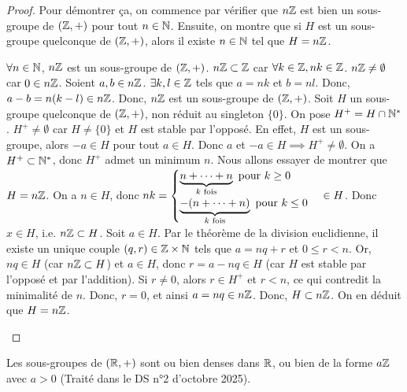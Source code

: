 \documentclass[12pt, a4paper]{report}
\begin{document}
\begin{proof}
    Pour démontrer ça, on commence par vérifier que $n\mathbb{Z}$ est bien un sous-groupe de $(\mathbb{Z},+)$ pour tout $n\in\mathbb{N}$. Ensuite, on montre que si $H$ est un sous-groupe quelconque de $(\mathbb{Z},+)$, alors il existe $n\in\mathbb{N}$ tel que $H=n\mathbb{Z}$.

    \begin{outline}
        \1 $\forall n \in \mathbb{N}$, $n\mathbb{Z}$ est un sous-groupe de $(\mathbb{Z},+)$.
            \2 $n\mathbb{Z} \subset \mathbb{Z}$ car $\forall k \in \mathbb{Z}, nk \in \mathbb{Z}$.
            \2 $n\mathbb{Z} \ne \emptyset$ car $0 \in n\mathbb{Z}$.
            \2 Soient $a,b \in n\mathbb{Z}$.
                \3 $\exists k,l \in \mathbb{Z}$ tels que $a= nk$ et $b=n l$.
                \3 Donc, $a - b = n(k - l) \in n\mathbb{Z}$.
            \2 Donc, $n\mathbb{Z}$ est un sous-groupe de $(\mathbb{Z},+)$.
        \1 Soit $H$ un sous-groupe quelconque de $(\mathbb{Z},+)$, non réduit au singleton $\{0\}$.
            \2 On pose $H^+ = H \cap \mathbb{N}^*$.
            \2 $H^+ \ne \emptyset$ car $H \ne \{0\}$ et $H$ est stable par l'opposé.
            \2 En effet, $H$ est un sous-groupe, alors $-a \in H$ pour tout $a \in H$.
            \2 Donc $a$ et $-a \in H \implies H^+ \ne \emptyset$.
            \2 On a $H^+ \subset \mathbb{N}^*$, donc $H^+$ admet un minimum $n$.
            \3 Nous allons essayer de montrer que $H = n\mathbb{Z}$.
            \2 On a $n \in H$, donc $nk = \begin{cases} \underbrace{n + \dots + n}_{k \text{ fois}}\text{ pour } k \ge 0 \\ \underbrace{-(n + \dots + n)}_{k \text{ fois}}\text{ pour } k \le 0\end{cases} \in H$.
            \2 Donc $x\in H$, i.e. $n\mathbb{Z} \subset H$.
            \2 Soit $a \in H$.
                \3 Par le théorème de la division euclidienne, il existe un unique couple $(q,r) \in \mathbb{Z} \times \mathbb{N}$ tels que $a = nq + r$ et $0 \le r < n$.
                \3 Or, $nq \in H$ (car $n\mathbb{Z} \subset H$) et $a \in H$, donc $r = a - nq \in H$ (car $H$ est stable par l'opposé et par l'addition).
                \3 Si $r \ne 0$, alors $r \in H^+$ et $r < n$, ce qui contredit la minimalité de $n$.
                \3 Donc, $r = 0$, et ainsi $a = nq \in n\mathbb{Z}$.
            \2 Donc, $H \subset n\mathbb{Z}$.
            \2 On en déduit que $H = n\mathbb{Z}$.
    \end{outline}
\end{proof}

\begin{remark}
    Les sous-groupes de $(\mathbb{R},+)$ sont ou bien denses dans $\mathbb{R}$, ou bien de la forme $a\mathbb{Z}$ avec $a>0$ (Traité dans le DS n°2 d'octobre 2025).
\end{remark}
\end{document}
